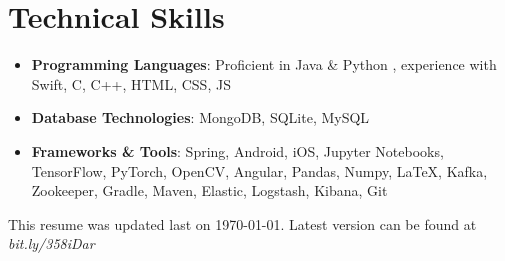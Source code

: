 \documentclass[letterpaper,11pt]{article}
\newcommand{\resumeSubHeadingListStart}{\begin{itemize}[leftmargin=*]}
\newcommand{\resumeSubHeadingListEnd}{\end{itemize}}
\begin{document}
	
	\section{Technical Skills}
	\resumeSubHeadingListStart
	\item{
		\textbf{Programming Languages}{: Proficient in Java \& Python , experience with Swift, C, C++, HTML, CSS, JS}}
	\vspace{-8pt}
	\item{
		\textbf{Database Technologies}{: MongoDB, SQLite, MySQL}}
	\vspace{-8pt}
	\item{
		\textbf{Frameworks \& Tools}{: Spring, Android, iOS, Jupyter Notebooks, TensorFlow, PyTorch, OpenCV, Angular, Pandas, Numpy, \LaTeX, Kafka, Zookeeper, Gradle, Maven, Elastic, Logstash, Kibana, Git}}
	\resumeSubHeadingListEnd
	
	\begin{center}
		\small This resume was updated last on \today. Latest version can be found at \textit{bit.ly/358iDar}
	\end{center}
	
	
\end{document}
